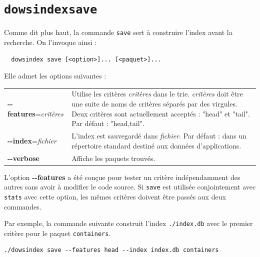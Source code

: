 \documentclass[a4paper]{report}
\theoremstyle{definition}
\newcommand{\dowsindex}{\texttt{dowsindex}\xspace}
\begin{document}

\section{\dowsindex \texttt{save}}

Comme dit plus haut, la commande \texttt{save} sert à construire l'index avant la recherche. On l'invoque ainsi :

\begin{center}
  \begin{verbatim}
  dowsindex save [<option>]... [<paquet>]...
  \end{verbatim}
\end{center}

Elle admet les options suivantes :

\begin{table}[h]
  \begin{tabularx}{\textwidth}{lX}
      \textbf{-{}-features}=\textit{critères} &
      Utilise les critères \textit{critères} dans le trie. \textit{critères} doit être une suite de noms de critères séparés par des virgules. Deux critères sont actuellement acceptés : "head" et "tail". Par défaut : "head,tail".
    \\
      \textbf{-{}-index}=\textit{fichier} &
      L'index est sauvegardé dans \textit{fichier}. Par défaut : dans un répertoire standard destiné aux données d'applications.
    \\
      \textbf{-{}-verbose} &
      Affiche les paquets trouvés.
  \end{tabularx}
\end{table}

L'option \textbf{-{}-features} a été conçue pour tester un critère indépendamment des autres sans avoir à modifier le code source. Si \texttt{save} est utilisée conjointement avec \texttt{stats} avec cette option, les mêmes critères doivent être passés aux deux commandes.

Par exemple, la commande suivante construit l'index \texttt{./index.db} avec le premier critère pour le paquet \texttt{containers}.

\begin{verbatim}
./dowsindex save --features head --index index.db containers
\end{verbatim}

\end{document}
